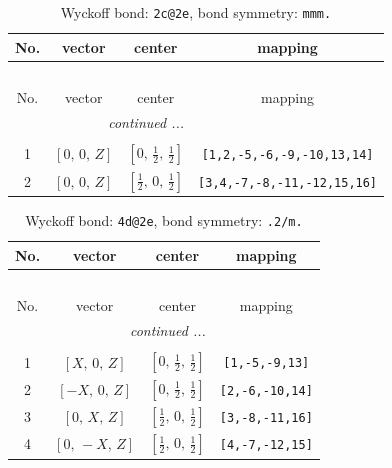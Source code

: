\documentclass[fleqn,8pt]{jsarticle}
\begin{document}
\begin{longtable}{cccc}
\caption{Wyckoff bond: {\tt 2c@2e}, bond symmetry: {\tt mmm.}}
 \\
 \hline \hline
No. & vector & center & mapping \\ \hline \endfirsthead

\multicolumn{3}{l}{\tablename\ \thetable{}} \\
 \hline \hline
No. & vector & center & mapping \\ \hline \endhead

 \hline \hline
\multicolumn{3}{r}{\footnotesize\it continued ...} \\ \endfoot

 \hline \hline
\multicolumn{3}{r}{} \\ \endlastfoot

1 & $\left[ 0,\, 0,\, Z \right]$ & $\left[ 0,\, \frac{1}{2},\, \frac{1}{2} \right]$ & {\tt [1,2,-5,-6,-9,-10,13,14]} \\ \hline
2 & $\left[ 0,\, 0,\, Z \right]$ & $\left[ \frac{1}{2},\, 0,\, \frac{1}{2} \right]$ & {\tt [3,4,-7,-8,-11,-12,15,16]} \\
\end{longtable}
\renewcommand{\arraystretch}{1.2}
\begin{longtable}{cccc}
\caption{Wyckoff bond: {\tt 4d@2e}, bond symmetry: {\tt .2/m.}}
 \\
 \hline \hline
No. & vector & center & mapping \\ \hline \endfirsthead

\multicolumn{3}{l}{\tablename\ \thetable{}} \\
 \hline \hline
No. & vector & center & mapping \\ \hline \endhead

 \hline \hline
\multicolumn{3}{r}{\footnotesize\it continued ...} \\ \endfoot

 \hline \hline
\multicolumn{3}{r}{} \\ \endlastfoot

1 & $\left[ X,\, 0,\, Z \right]$ & $\left[ 0,\, \frac{1}{2},\, \frac{1}{2} \right]$ & {\tt [1,-5,-9,13]} \\ \hline
2 & $\left[ - X,\, 0,\, Z \right]$ & $\left[ 0,\, \frac{1}{2},\, \frac{1}{2} \right]$ & {\tt [2,-6,-10,14]} \\ \hline
3 & $\left[ 0,\, X,\, Z \right]$ & $\left[ \frac{1}{2},\, 0,\, \frac{1}{2} \right]$ & {\tt [3,-8,-11,16]} \\ \hline
4 & $\left[ 0,\, - X,\, Z \right]$ & $\left[ \frac{1}{2},\, 0,\, \frac{1}{2} \right]$ & {\tt [4,-7,-12,15]} \\
\end{longtable}
\end{document}
